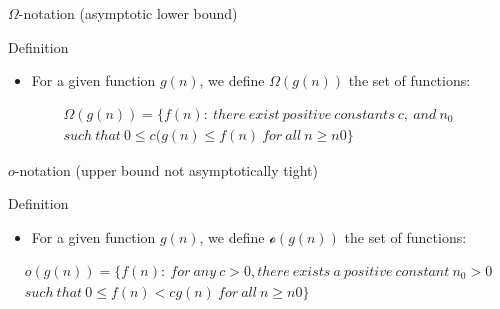 \begin{frame}{$\Omega$-notation (asymptotic lower bound)}

  \begin{block}{Definition}
    \begin{itemize}
    \item For a given function $g(n)$, we define
      $\Omega(g(n))$ the set of functions:
    \end{itemize}
    
    \begin{small}
      \begin{multline*}
        \Omega(g(n)) = \{ f(n):\ there\ exist\ positive\ constants\ c,\ and\ n_0\ \\ such\ that\ 
                       0 \leq c(g(n) \leq f(n)\ for\ all\ n \geq n0\}
      \end{multline*}
    \end{small}
  \end{block}

\end{frame}

\begin{frame}{$o$-notation (upper bound not asymptotically tight)}

  \begin{block}{Definition}
    \begin{itemize}
    \item For a given function $g(n)$, we define
      $\mathcal{o}(g(n))$ the set of functions:
    \end{itemize}
    
    \begin{small}
      \begin{multline*}
        o(g(n)) = \{ f(n):\ for\ any\ c > 0, there\ exists\ a\ positive\ constant\ n_0 > 0\ \\ such\ that\ 
                       0 \leq f(n) < cg(n) \ for\ all\ n \geq n0\}
      \end{multline*}
    \end{small}
  \end{block}

\end{frame}

